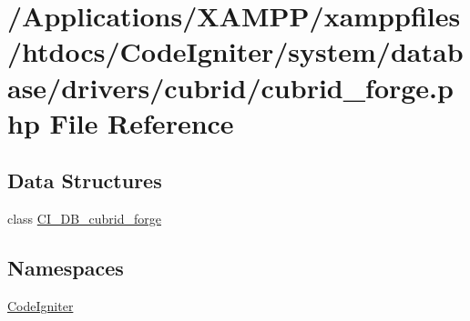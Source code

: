 \hypertarget{cubrid__forge_8php}{}\section{/\+Applications/\+X\+A\+M\+P\+P/xamppfiles/htdocs/\+Code\+Igniter/system/database/drivers/cubrid/cubrid\+\_\+forge.php File Reference}
\label{cubrid__forge_8php}
\subsection*{Data Structures}
\begin{DoxyCompactItemize}
\item 
class \mbox{\hyperlink{class_c_i___d_b__cubrid__forge}{C\+I\+\_\+\+D\+B\+\_\+cubrid\+\_\+forge}}
\end{DoxyCompactItemize}
\subsection*{Namespaces}
\begin{DoxyCompactItemize}
\item 
 \mbox{\hyperlink{namespace_code_igniter}{Code\+Igniter}}
\end{DoxyCompactItemize}
